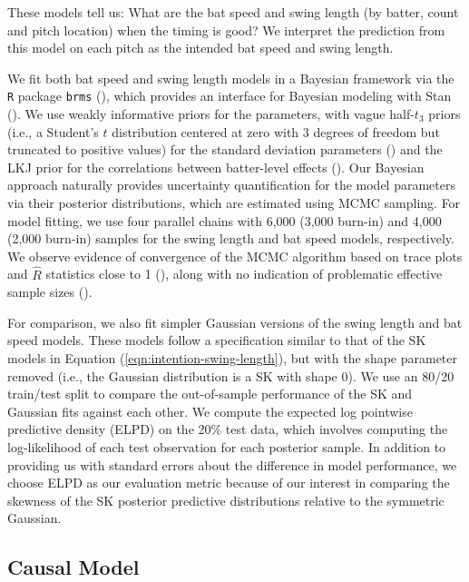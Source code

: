 \documentclass{article}
\begin{document}
    These models tell us: What are the bat speed and swing length (by batter, count and pitch location) when the timing is good? We interpret the prediction from this model on each pitch as the intended bat speed and swing length.
    
    We fit both bat speed and swing length models in a Bayesian framework via the \texttt{R} package \texttt{brms}  (\cite{burkner_bayesian_2021}), which provides an interface for Bayesian modeling with Stan (\cite{carpenter_stan_2017}). We use weakly informative priors for the parameters, with vague half-$t_3$ priors (i.e., a Student's $t$ distribution centered at zero with 3 degrees of freedom but truncated to positive values) for the standard deviation parameters (\cite{gelman_prior_2006}) and the LKJ prior for the correlations between batter-level effects (\cite{lewandowski_generating_2009}). Our Bayesian approach naturally provides uncertainty quantification for the model parameters via their posterior distributions, which are estimated using MCMC sampling. For model fitting, we use four parallel chains with 6,000 (3,000 burn-in) and 4,000 (2,000 burn-in) samples for the swing length and bat speed models, respectively. We observe evidence of convergence of the MCMC algorithm based on trace plots and $\hat{R}$ statistics close to 1 (\cite{gelman_inference_1992, brooks_general_1998}), along with no indication of problematic effective sample sizes (\cite{gelman_bayesian_2020}).
    
    For comparison, we also fit simpler Gaussian versions of the swing length and bat speed models. These models follow a specification similar to that of the SK models in Equation (\ref{eqn:intention-swing-length}), but with the shape parameter removed (i.e., the Gaussian distribution is a SK with shape 0). We use an 80/20 train/test split to compare the out-of-sample performance of the SK and Gaussian fits against each other. We compute the expected log pointwise predictive density (ELPD) on the 20\% test data, which involves computing the log-likelihood of each test observation for each posterior sample. In addition to providing us with standard errors about the difference in model performance, we choose ELPD as our evaluation metric because of our interest in comparing the skewness of the SK posterior predictive distributions relative to the symmetric Gaussian.

    \subsection{Causal Model}
    \label{sec:methods-causal}
\end{document}
